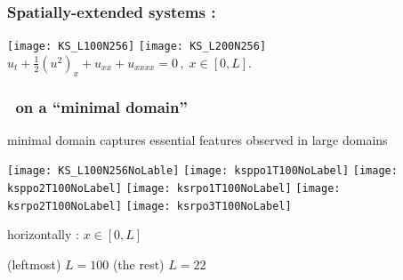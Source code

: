 
\begin{frame}[shrink]%
  \frametitle{Spatially-extended systems : \KS}

  \begin{center}
    \texttt{[image: KS\_L100N256]}
    \texttt{[image: KS\_L200N256]}
    {
      $u_t+\frac{1}{2}(u^2)_x+u_{xx}+u_{xxxx}=0\,,\; x\in [0,L]$.
    }
  \end{center}

\vfill
\end{frame}

\begin{frame}[shrink]%
  \frametitle{\KS\ on a ``minimal domain''}

\bigskip\bigskip

    minimal domain captures essential features observed in large domains

\bigskip

  \begin{center}
    \texttt{[image: KS\_L100N256NoLable]}
    \texttt{[image: ksppo1T100NoLabel]}
    \texttt{[image: ksppo2T100NoLabel]}
    \texttt{[image: ksrpo1T100NoLabel]}
    \texttt{[image: ksrpo2T100NoLabel]}
    \texttt{[image: ksrpo3T100NoLabel]}
    {
      horizontally : $x\in [0,L]$

\bigskip

      {\color{blue} (leftmost)  $L = 100$ \qquad (the rest)  $L=22$ }
    }

  \end{center}

\end{frame}
